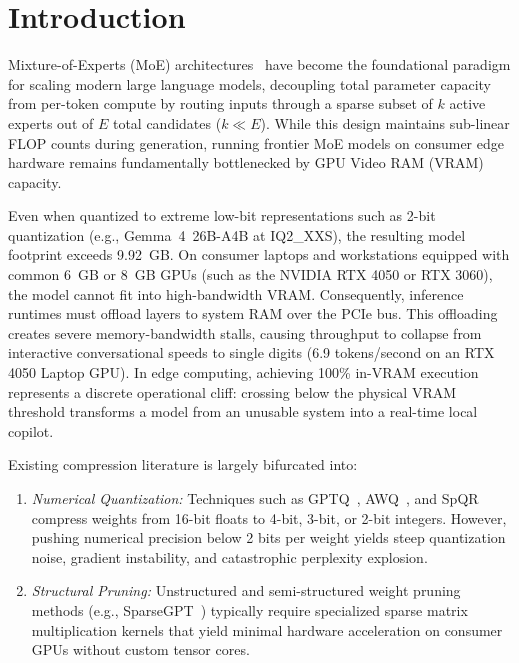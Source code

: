 \documentclass[conference]{IEEEtran}
\begin{document}
\section{Introduction}

Mixture-of-Experts (MoE) architectures~\cite{jiang2024mixtral,dai2024deepseekmoe,team2025gemma} have become the foundational paradigm for scaling modern large language models, decoupling total parameter capacity from per-token compute by routing inputs through a sparse subset of $k$ active experts out of $E$ total candidates ($k \ll E$). While this design maintains sub-linear FLOP counts during generation, running frontier MoE models on consumer edge hardware remains fundamentally bottlenecked by GPU Video RAM (VRAM) capacity.

Even when quantized to extreme low-bit representations such as 2-bit quantization (e.g., Gemma~4~26B-A4B at IQ2\_XXS), the resulting model footprint exceeds 9.92~GB. On consumer laptops and workstations equipped with common 6~GB or 8~GB GPUs (such as the NVIDIA RTX 4050 or RTX 3060), the model cannot fit into high-bandwidth VRAM. Consequently, inference runtimes must offload layers to system RAM over the PCIe bus. This offloading creates severe memory-bandwidth stalls, causing throughput to collapse from interactive conversational speeds to single digits (6.9 tokens/second on an RTX 4050 Laptop GPU). In edge computing, achieving 100\% in-VRAM execution represents a discrete operational cliff: crossing below the physical VRAM threshold transforms a model from an unusable system into a real-time local copilot.

Existing compression literature is largely bifurcated into:
\begin{enumerate}
\item \textit{Numerical Quantization:} Techniques such as GPTQ~\cite{frantar2022gptq}, AWQ~\cite{lin2024awq}, and SpQR~\cite{dettmers2023spqr} compress weights from 16-bit floats to 4-bit, 3-bit, or 2-bit integers. However, pushing numerical precision below 2 bits per weight yields steep quantization noise, gradient instability, and catastrophic perplexity explosion.
\item \textit{Structural Pruning:} Unstructured and semi-structured weight pruning methods (e.g., SparseGPT~\cite{frantar2023sparsegpt}) typically require specialized sparse matrix multiplication kernels that yield minimal hardware acceleration on consumer GPUs without custom tensor cores.
\end{enumerate}
\end{document}
